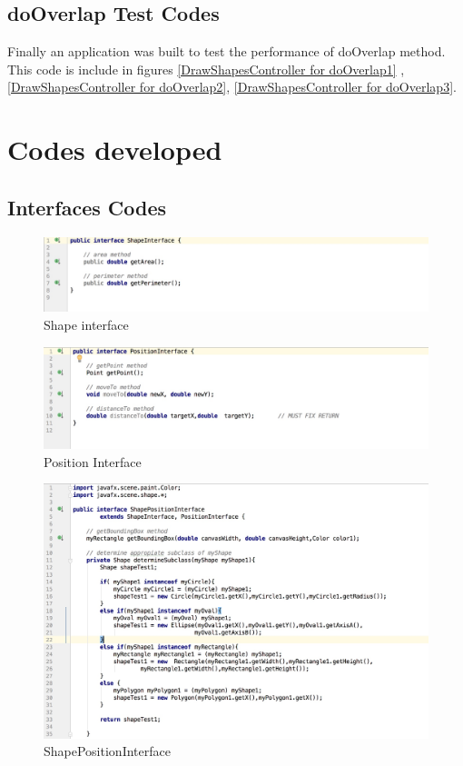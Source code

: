 \documentclass[a4paper,12pt]{article}
\begin{document}
\subsection{doOverlap Test Codes}
Finally an application was built to test the performance of doOverlap method. This code is include in figures \ref{DrawShapesController for doOverlap1} ,\ref{DrawShapesController for doOverlap2}, \ref{DrawShapesController for doOverlap3}.


\section{Codes developed}

\subsection{Interfaces Codes}
\begin{figure}[H]
   \centering
   \includegraphics[width = 17cm]{shape_interface} %
   \caption{Shape interface}
   \label{Shape interface}
\end{figure}

\begin{figure}[H]
   \centering
   \includegraphics[width = 17cm]{PositionInterface} %
   \caption{Position Interface}
   \label{Position Interface}
\end{figure}

\begin{figure}[H]
   \centering
   \includegraphics[width = 17cm]{ShapePositionInterface} %
   \caption{ShapePositionInterface}
   \label{ShapePositionInterface}
\end{figure}
\end{document}

